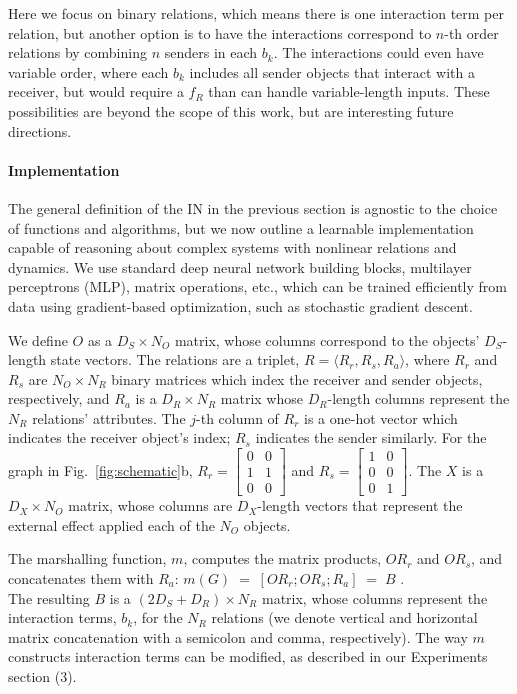 \documentclass{article}
\newcommand{\DS}{D_S}
\newcommand{\DR}{D_R}
\newcommand{\DX}{D_X}
\newcommand{\NO}{N_O}
\newcommand{\NR}{N_R}
\begin{document}
Here we focus on binary relations, which means there is one
interaction term per relation, but another option is to have the
interactions correspond to $n$-th order relations by combining $n$
senders in each $b_k$. The interactions could even have variable
order, where each $b_k$ includes all sender objects that interact with
a receiver, but would require a $f_R$ than can handle variable-length
inputs. These possibilities are beyond the scope of this work, but are
interesting future directions.

\paragraph{Implementation}

The general definition of the IN in the previous section is agnostic
to the choice of functions and algorithms, but we now outline a
learnable implementation capable of reasoning about complex systems
with nonlinear relations and dynamics. We use standard deep neural
network building blocks, multilayer perceptrons (MLP), matrix
operations, etc., which can be trained efficiently from data using
gradient-based optimization, such as stochastic gradient descent.

We define $O$ as a $\DS \times \NO$ matrix, whose columns correspond
to the objects' $\DS$-length state vectors. The relations are a
triplet, $R=\langle R_r, R_s,R_a \rangle$, where $R_r$ and $R_s$ are
$\NO \times \NR$ binary matrices which index the receiver and sender
objects, respectively, and $R_a$ is a $\DR \times \NR$ matrix whose
$\DR$-length columns represent the $\NR$ relations' attributes. The
$j$-th column of $R_r$ is a one-hot vector which indicates the
receiver object's index; $R_s$ indicates the sender similarly. For the
graph in Fig.~\ref{fig:schematic}b, $R_r = \left[ \begin{smallmatrix}
    0 & 0 \\
    1 & 1 \\
    0 & 0
\end{smallmatrix}\right]$ and
$R_s = \left[ \begin{smallmatrix}
    1 & 0 \\
    0 & 0 \\
    0 & 1
\end{smallmatrix}\right]$.
The $X$ is a $\DX \times \NO$ matrix, whose columns are $\DX$-length
vectors that represent the external effect applied each of the $\NO$
objects.

The marshalling function, $m$, computes the matrix products, $O R_r$
and $O R_s$, and concatenates them with $R_a$: \quad  $ m(G) \; = \;  [ O R_r ; O R_s; R_a] \; = \; B$ . \\
The resulting $B$ is a $(2 \DS + \DR) \times \NR$ matrix, whose
columns represent the interaction terms, $b_k$, for the $\NR$
relations (we denote vertical and horizontal matrix concatenation with
a semicolon and comma, respectively). The way $m$ constructs
interaction terms can be modified, as described in our Experiments
section (3).
\end{document}
